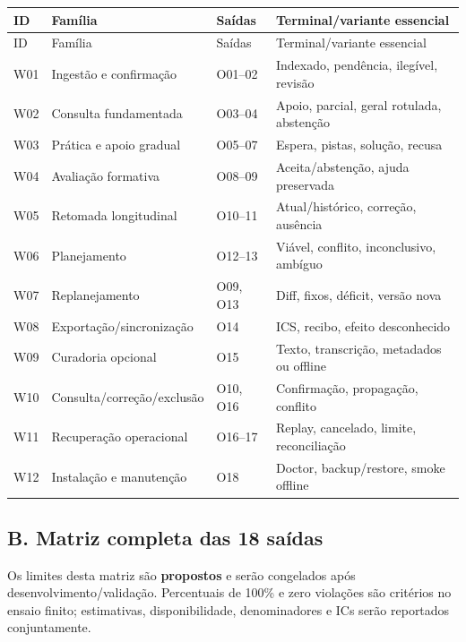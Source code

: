 \documentclass[12pt]{article}
\begin{document}
\begin{center}\small
\begin{longtable}{@{}L{1.0cm}L{5.7cm}L{2.8cm}L{5.3cm}@{}}
\toprule ID & Família & Saídas & Terminal/variante essencial \\ \midrule
\endfirsthead
\toprule ID & Família & Saídas & Terminal/variante essencial \\ \midrule
\endhead
W01 & Ingestão e confirmação & O01--02 & Indexado, pendência, ilegível, revisão \\
W02 & Consulta fundamentada & O03--04 & Apoio, parcial, geral rotulada, abstenção \\
W03 & Prática e apoio gradual & O05--07 & Espera, pistas, solução, recusa \\
W04 & Avaliação formativa & O08--09 & Aceita/abstenção, ajuda preservada \\
W05 & Retomada longitudinal & O10--11 & Atual/histórico, correção, ausência \\
W06 & Planejamento & O12--13 & Viável, conflito, inconclusivo, ambíguo \\
W07 & Replanejamento & O09, O13 & Diff, fixos, déficit, versão nova \\
W08 & Exportação/sincronização & O14 & ICS, recibo, efeito desconhecido \\
W09 & Curadoria opcional & O15 & Texto, transcrição, metadados ou offline \\
W10 & Consulta/correção/exclusão & O10, O16 & Confirmação, propagação, conflito \\
W11 & Recuperação operacional & O16--17 & Replay, cancelado, limite, reconciliação \\
W12 & Instalação e manutenção & O18 & Doctor, backup/restore, smoke offline \\
\bottomrule
\end{longtable}
\end{center}

\subsection*{B. Matriz completa das 18 saídas}

Os limites desta matriz são \textbf{propostos} e serão congelados após desenvolvimento/validação. Percentuais de 100\% e zero violações são critérios no ensaio finito; estimativas, disponibilidade, denominadores e ICs serão reportados conjuntamente.
\end{document}
